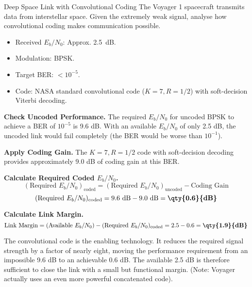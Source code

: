 \begin{workedexample}{Deep Space Link with Convolutional Coding}
     The Voyager 1 spacecraft transmits data from interstellar space. Given the extremely weak signal, analyse how convolutional coding makes communication possible.
    \begin{itemize}
        \item Received $E_b/N_0$: Approx. \qty{2.5}{dB}.
        \item Modulation: BPSK.
        \item Target BER: $< 10^{-5}$.
        \item Code: NASA standard convolutional code ($K=7, R=1/2$) with soft-decision Viterbi decoding.
    \end{itemize}
    \begin{derivationsteps}
        \step \textbf{Check Uncoded Performance.} The required $E_b/N_0$ for uncoded BPSK to achieve a BER of $10^{-5}$ is 9.6 dB. With an available $E_b/N_0$ of only 2.5 dB, the uncoded link would fail completely (the BER would be worse than $10^{-1}$).
        
        \step \textbf{Apply Coding Gain.} The $K=7, R=1/2$ code with soft-decision decoding provides approximately 9.0 dB of coding gain at this BER.
        
        \step \textbf{Calculate Required Coded $E_b/N_0$.}
        \[ (\text{Required } E_b/N_0)_{\text{coded}} = (\text{Required } E_b/N_0)_{\text{uncoded}} - \text{Coding Gain} \]
        \[ (\text{Required } E_b/N_0)_{\text{coded}} = 9.6 \text{ dB} - 9.0 \text{ dB} = \textbf{\qty{0.6}{dB}} \]
        
        \step \textbf{Calculate Link Margin.}
        \[ \text{Link Margin} = (\text{Available } E_b/N_0) - (\text{Required } E_b/N_0)_{\text{coded}} = 2.5 - 0.6 = \textbf{\qty{1.9}{dB}} \]
    \end{derivationsteps}
    
     The convolutional code is the enabling technology. It reduces the required signal strength by a factor of nearly eight, moving the performance requirement from an impossible 9.6 dB to an achievable 0.6 dB. The available 2.5 dB is therefore sufficient to close the link with a small but functional margin. (Note: Voyager actually uses an even more powerful concatenated code).
\end{workedexample}


